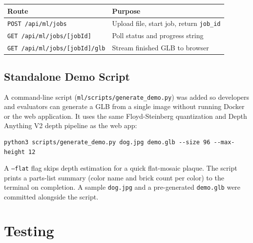 \documentclass[12pt]{article}
\begin{document}
\begin{center}
\begin{tabular}{ll}
\toprule
\textbf{Route} & \textbf{Purpose} \\
\midrule
\texttt{POST /api/ml/jobs}             & Upload file, start job, return \texttt{job\_id} \\
\texttt{GET  /api/ml/jobs/[jobId]}     & Poll status and progress string \\
\texttt{GET  /api/ml/jobs/[jobId]/glb} & Stream finished GLB to browser \\
\bottomrule
\end{tabular}
\end{center}

\subsection{Standalone Demo Script}

A command-line script (\texttt{ml/scripts/generate\_demo.py}) was added so
developers and evaluators can generate a GLB from a single image without
running Docker or the web application. It uses the same Floyd-Steinberg
quantization and Depth Anything V2 depth pipeline as the web app:

\begin{verbatim}
python3 scripts/generate_demo.py dog.jpg demo.glb --size 96 --max-height 12
\end{verbatim}

A \texttt{--flat} flag skips depth estimation for a quick flat-mosaic plaque.
The script prints a parts-list summary (color name and brick count per color)
to the terminal on completion. A sample \texttt{dog.jpg} and a pre-generated
\texttt{demo.glb} were committed alongside the script.

\section{Testing}
\end{document}
